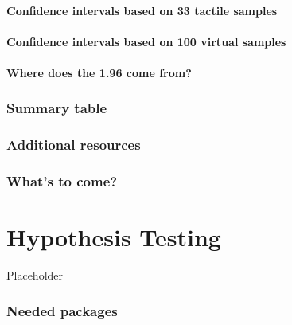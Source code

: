 \documentclass[
  12pt, krantz2,
]{krantz}
\begin{document}
\hypertarget{confidence-intervals-based-on-33-tactile-samples}{%
\subsubsection*{Confidence intervals based on 33 tactile samples}\label{confidence-intervals-based-on-33-tactile-samples}}


\hypertarget{confidence-intervals-based-on-100-virtual-samples}{%
\subsubsection*{Confidence intervals based on 100 virtual samples}\label{confidence-intervals-based-on-100-virtual-samples}}


\hypertarget{where-does-the-1.96-come-from}{%
\subsubsection*{Where does the 1.96 come from?}\label{where-does-the-1.96-come-from}}


\hypertarget{ci-conclusion-table}{%
\subsection{Summary table}\label{ci-conclusion-table}}

\hypertarget{additional-resources-6}{%
\subsection{Additional resources}\label{additional-resources-6}}

\hypertarget{whats-to-come-7}{%
\subsection{What's to come?}\label{whats-to-come-7}}

\hypertarget{hypothesis-testing}{%
\chapter{Hypothesis Testing}\label{hypothesis-testing}}

Placeholder

\hypertarget{needed-packages-7}{%
\subsection*{Needed packages}\label{needed-packages-7}}
\end{document}
